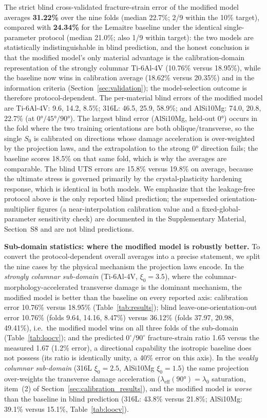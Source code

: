 \documentclass[twocolumn]{sagej}
\begin{document}
The strict blind cross-validated fracture-strain error of the modified model averages \textbf{31.22\%} over the nine folds (median 22.7\%; 2/9 within the 10\% target), compared with \textbf{24.34\%} for the Lemaitre baseline under the identical single-parameter protocol (median 21.0\%; also 1/9 within target): the two models are statistically indistinguishable in blind prediction, and the honest conclusion is that the modified model's only material advantage is the calibration-domain representation of the strongly columnar Ti-6Al-4V (10.76\% versus 18.95\%), while the baseline now wins in calibration average (18.62\% versus 20.35\%) and in the information criteria (Section~\ref{sec:validation}); the model-selection outcome is therefore protocol-dependent. The per-material blind errors of the modified model are Ti-6Al-4V: 9.6, 14.2, 8.5\%; 316L: 46.5, 25.9, 58.9\%; and AlSi10Mg: 74.0, 20.8, 22.7\% (at $\ang{0}/\ang{45}/\ang{90}$). The largest blind error (AlSi10Mg, held-out $\ang{0}$) occurs in the fold where the two training orientations are both oblique/transverse, so the single $S_0$ is calibrated on directions whose damage acceleration is over-weighted by the projection laws, and the extrapolation to the strong $\ang{0}$ direction fails; the baseline scores 18.5\% on that same fold, which is why the averages are comparable. The blind UTS errors are 15.8\% versus 19.8\% on average, because the ultimate stress is governed primarily by the crystal-plasticity hardening response, which is identical in both models. We emphasize that the leakage-free protocol above is the only reported blind prediction; the superseded orientation-multiplier figures (a near-interpolation calibration value and a fixed-global-parameter sensitivity check) are documented in the Supplementary Material, Section~S8 and are not blind predictions.



\textbf{Sub-domain statistics: where the modified model is robustly better.}
To convert the protocol-dependent overall averages into a precise statement, we split the nine cases by the physical mechanism the projection laws encode. In the \emph{strongly columnar sub-domain} (Ti-6Al-4V, $\xi_0 = 3.5$), where the columnar-morphology-accelerated transverse damage is the dominant mechanism, the modified model is better than the baseline on every reported axis: calibration error 10.76\% versus 18.95\% (Table~\ref{tab:results}); blind leave-one-orientation-out error 10.76\% (folds 9.64, 14.16, 8.47\%) versus 36.12\% (folds 37.97, 20.98, 49.41\%), i.e.\ the modified model wins on all three folds of the sub-domain (Table~\ref{tab:loocv}); and the predicted $0^\circ/90^\circ$ fracture-strain ratio 1.65 versus the measured 1.67 (1.2\% error), a directional capability the isotropic baseline does not possess (its ratio is identically unity, a 40\% error on this axis). In the \emph{weakly columnar sub-domain} (316L $\xi_0 = 2.5$, AlSi10Mg $\xi_0 = 1.5$) the same projection over-weights the transverse damage acceleration ($\lambda_{\mathrm{eff}}(\ang{90}) = \lambda_0$ saturation, item~(2) of Section~\ref{sec:calibration_results}), and the modified model is \emph{worse} than the baseline in blind prediction (316L: 43.8\% versus 21.8\%; AlSi10Mg: 39.1\% versus 15.1\%, Table~\ref{tab:loocv}).
\end{document}

